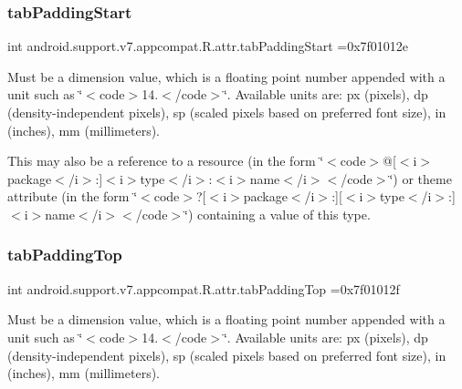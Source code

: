 \subsubsection{\texorpdfstring{tab\+Padding\+Start}{tabPaddingStart}}
{\footnotesize\ttfamily int android.\+support.\+v7.\+appcompat.\+R.\+attr.\+tab\+Padding\+Start =0x7f01012e\hspace{0.3cm}{\ttfamily [static]}}

Must be a dimension value, which is a floating point number appended with a unit such as \char`\"{}$<$code$>$14.\+5sp$<$/code$>$\char`\"{}. Available units are\+: px (pixels), dp (density-\/independent pixels), sp (scaled pixels based on preferred font size), in (inches), mm (millimeters). 

This may also be a reference to a resource (in the form \char`\"{}$<$code$>$@\mbox{[}$<$i$>$package$<$/i$>$\+:\mbox{]}$<$i$>$type$<$/i$>$\+:$<$i$>$name$<$/i$>$$<$/code$>$\char`\"{}) or theme attribute (in the form \char`\"{}$<$code$>$?\mbox{[}$<$i$>$package$<$/i$>$\+:\mbox{]}\mbox{[}$<$i$>$type$<$/i$>$\+:\mbox{]}$<$i$>$name$<$/i$>$$<$/code$>$\char`\"{}) containing a value of this type. \mbox{\label{classandroid_1_1support_1_1v7_1_1appcompat_1_1R_1_1attr_a7095b04954f6877225cff0ea0097259a}} 
\subsubsection{\texorpdfstring{tab\+Padding\+Top}{tabPaddingTop}}
{\footnotesize\ttfamily int android.\+support.\+v7.\+appcompat.\+R.\+attr.\+tab\+Padding\+Top =0x7f01012f\hspace{0.3cm}{\ttfamily [static]}}

Must be a dimension value, which is a floating point number appended with a unit such as \char`\"{}$<$code$>$14.\+5sp$<$/code$>$\char`\"{}. Available units are\+: px (pixels), dp (density-\/independent pixels), sp (scaled pixels based on preferred font size), in (inches), mm (millimeters). 

